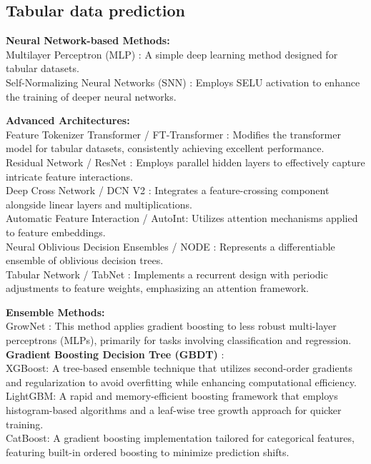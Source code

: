 \subsection{Tabular data prediction}
\textbf{Neural Network-based Methods:}\\
    Multilayer Perceptron (MLP) \citep{mlp,tabr}: A simple deep learning method designed for tabular datasets. \\ 
    Self-Normalizing Neural Networks (SNN)  \citep{snn}: Employs SELU activation to enhance the training of deeper neural networks.

\textbf{Advanced Architectures:}\\
Feature Tokenizer Transformer / FT-Transformer \citep{vaswani2017attentiontransformer}: Modifies the transformer model for tabular datasets, consistently achieving excellent performance.  \\
Residual Network / ResNet \citep{restnet}: Employs parallel hidden layers to effectively capture intricate feature interactions.  \\
Deep Cross Network / DCN V2 \citep{DCNV2}: Integrates a feature-crossing component alongside linear layers and multiplications.  \\
Automatic Feature Interaction / AutoInt\citep{AutoInt}: Utilizes attention mechanisms applied to feature embeddings.  \\
Neural Oblivious Decision Ensembles / NODE \citep{NODE}: Represents a differentiable ensemble of oblivious decision trees.  \\
Tabular Network / TabNet \citep{TabNet}: Implements a recurrent design with periodic adjustments to feature weights, emphasizing an attention framework.

\textbf{Ensemble Methods:}\\
   GrowNet \citep{GrowNet}: This method applies gradient boosting to less robust multi-layer perceptrons (MLPs), primarily for tasks involving classification and regression.
\textbf{Gradient Boosting Decision Tree (GBDT) } \citep{Grinsztajn2022} : \\
    XGBoost: A tree-based ensemble technique that utilizes second-order gradients and regularization to avoid overfitting while enhancing computational efficiency.\\
    LightGBM: A rapid and memory-efficient boosting framework that employs histogram-based algorithms and a leaf-wise tree growth approach for quicker training.\\
    CatBoost: A gradient boosting implementation tailored for categorical features, featuring built-in ordered boosting to minimize prediction shifts.

